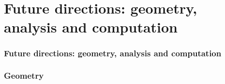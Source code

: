 \documentclass[aspectratio=169]{beamer}
\begin{document}
\section{Future directions: geometry, analysis and computation}

\begin{frame}
    \frametitle{Future directions: geometry, analysis and computation}
    \begin{figure}[ht]\centering
    \end{figure}
\end{frame}

\begin{frame}
    \frametitle{Geometry}
    \begin{figure}[ht]\centering
    \end{figure}
\end{frame}
\end{document}
